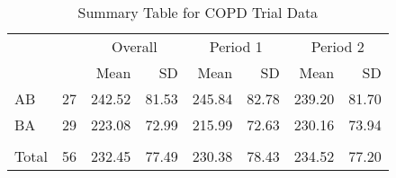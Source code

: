 \begin{table}

\caption{\label{tab:pefrDataSummary}Summary Table for COPD Trial Data}
\centering
\begin{tabular}[t]{l>{}r|rrrrrr}
\toprule
\multicolumn{2}{c}{ } & \multicolumn{2}{c}{Overall} & \multicolumn{2}{c}{Period 1} & \multicolumn{2}{c}{Period 2} \\
\cmidrule(l{3pt}r{3pt}){3-4} \cmidrule(l{3pt}r{3pt}){5-6} \cmidrule(l{3pt}r{3pt}){7-8}
 &  & Mean & SD & Mean & SD & Mean & SD\\
\midrule
AB & 27 & 242.52 & 81.53 & 245.84 & 82.78 & 239.20 & 81.70\\
BA & 29 & 223.08 & 72.99 & 215.99 & 72.63 & 230.16 & 73.94\\
\midrule\\
Total & 56 & 232.45 & 77.49 & 230.38 & 78.43 & 234.52 & 77.20\\
\bottomrule
\end{tabular}
\end{table}
